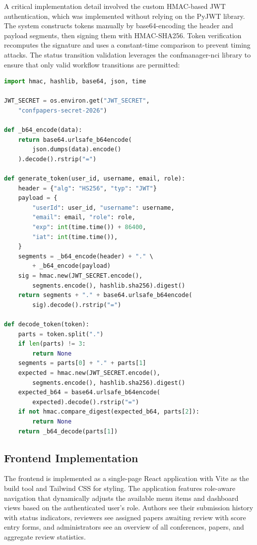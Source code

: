 \documentclass[conference]{IEEEtran}
\begin{document}
A critical implementation detail involved the custom HMAC-based JWT authentication, which was implemented without relying on the PyJWT library. The system constructs tokens manually by base64-encoding the header and payload segments, then signing them with HMAC-SHA256. Token verification recomputes the signature and uses a constant-time comparison to prevent timing attacks. The status transition validation leverages the confmanager-nci library to ensure that only valid workflow transitions are permitted:

\begin{lstlisting}[language=Python, caption={Custom HMAC-based JWT and status transition}]
import hmac, hashlib, base64, json, time

JWT_SECRET = os.environ.get("JWT_SECRET",
    "confpapers-secret-2026")

def _b64_encode(data):
    return base64.urlsafe_b64encode(
        json.dumps(data).encode()
    ).decode().rstrip("=")

def generate_token(user_id, username, email, role):
    header = {"alg": "HS256", "typ": "JWT"}
    payload = {
        "userId": user_id, "username": username,
        "email": email, "role": role,
        "exp": int(time.time()) + 86400,
        "iat": int(time.time()),
    }
    segments = _b64_encode(header) + "." \
        + _b64_encode(payload)
    sig = hmac.new(JWT_SECRET.encode(),
        segments.encode(), hashlib.sha256).digest()
    return segments + "." + base64.urlsafe_b64encode(
        sig).decode().rstrip("=")

def decode_token(token):
    parts = token.split(".")
    if len(parts) != 3:
        return None
    segments = parts[0] + "." + parts[1]
    expected = hmac.new(JWT_SECRET.encode(),
        segments.encode(), hashlib.sha256).digest()
    expected_b64 = base64.urlsafe_b64encode(
        expected).decode().rstrip("=")
    if not hmac.compare_digest(expected_b64, parts[2]):
        return None
    return _b64_decode(parts[1])
\end{lstlisting}

\subsection{Frontend Implementation}

The frontend is implemented as a single-page React application with Vite as the build tool and Tailwind CSS for styling. The application features role-aware navigation that dynamically adjusts the available menu items and dashboard views based on the authenticated user's role. Authors see their submission history with status indicators, reviewers see assigned papers awaiting review with score entry forms, and administrators see an overview of all conferences, papers, and aggregate review statistics.
\end{document}

